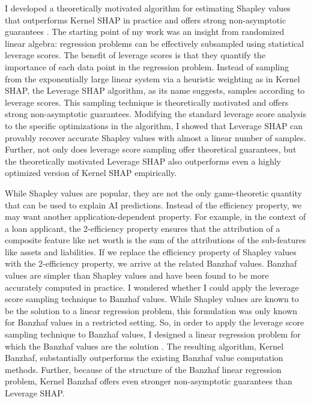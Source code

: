 \documentclass[11pt]{article}
\begin{document}
{I developed a theoretically motivated algorithm for estimating Shapley values that outperforms Kernel SHAP in practice and offers strong non-asymptotic guarantees \cite{musco2024leverage}.
The starting point of my work was an insight from randomized linear algebra: regression problems can be effectively subsampled using statistical leverage scores.
The benefit of leverage scores is that they quantify the importance of each data point in the regression problem.
Instead of sampling from the exponentially large linear system via a heuristic weighting as in Kernel SHAP, the Leverage SHAP algorithm, as its name suggests, samples according to leverage scores.
This sampling technique is theoretically motivated and offers strong non-asymptotic guarantees.
Modifying the standard leverage score analysis to the specific optimizations in the algorithm, I showed that Leverage SHAP can provably recover accurate Shapley values with almost a linear number of samples.
Further, not only does leverage score sampling offer theoretical guarantees, but the theoretically motivated Leverage SHAP also outperforms even a highly optimized version of Kernel SHAP empirically.

While Shapley values are popular, they are not the only game-theoretic quantity that can be used to explain AI predictions.
Instead of the efficiency property, we may want another application-dependent property.
For example, in the context of a loan applicant, the 2-efficiency property ensures that the attribution of a composite feature like net worth is the sum of the attributions of the sub-features like assets and liabilities.
If we replace the efficiency property of Shapley values with the 2-efficiency property, we arrive at the related Banzhaf values.
Banzhaf values are simpler than Shapley values and have been found to be more accurately computed in practice.
I wondered whether I could apply the leverage score sampling technique to Banzhaf values.
While Shapley values are known to be the solution to a linear regression problem, this formulation was only known for Banzhaf values in a restricted setting.
So, in order to apply the leverage score sampling technique to Banzhaf values, I designed a linear regression problem for which the Banzhaf values are the solution \cite{liu2024kernel}.
The resulting algorithm, Kernel Banzhaf, substantially outperforms the existing Banzhaf value computation methods.
Further, because of the structure of the Banzhaf linear regression problem, Kernel Banzhaf offers even stronger non-asymptotic guarantees than Leverage SHAP.

}
\end{document}
